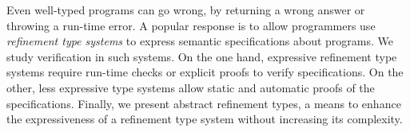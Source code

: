 Even well-typed programs can go wrong,
by returning a wrong answer or 
throwing a run-time error.
A popular response is
to allow programmers use
\textit{refinement type systems}
to express semantic specifications 
about programs.
%
We study verification in such systems.
%
On the one hand, expressive refinement type systems
require run-time checks
or explicit proofs to verify specifications.
On the other,
less expressive type systems
allow static and automatic proofs of the specifications.
%
Finally, we present abstract refinement types, 
a means to enhance the expressiveness of
a refinement type system without increasing its complexity.